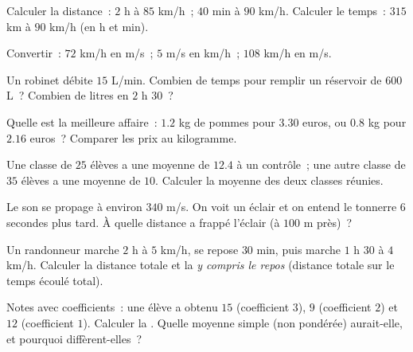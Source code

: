 \begin{exercise}[$\star$]\label{exo:g8:speed:2}
Calculer la distance~: $2$ h à $85$ km/h~; $40$ min à $90$ km/h.
Calculer le temps~: $315$ km à $90$ km/h (en h et min).
\end{exercise}

\begin{exercise}[$\star$]\label{exo:g8:speed:3}
Convertir~: $72$ km/h en m/s~; $5$ m/s en km/h~; $108$ km/h en m/s.
\end{exercise}

\begin{exercise}[$\star$]\label{exo:g8:speed:4}
Un robinet débite $15$ L/min. Combien de temps pour remplir un
réservoir de $600$ L~? Combien de litres en $2$ h $30$~?
\end{exercise}

\begin{exercise}[$\star$]\label{exo:g8:speed:5}
Quelle est la meilleure affaire~: $1.2$ kg de pommes pour $3.30$
euros, ou $0.8$ kg pour $2.16$ euros~? Comparer les prix au kilogramme.
\end{exercise}

\begin{exercise}[$\star$]\label{exo:g8:speed:6}
Une classe de $25$ élèves a une moyenne de $12.4$ à un contrôle~;
une autre classe de $35$ élèves a une moyenne de $10$. Calculer la
moyenne des deux classes réunies.
\end{exercise}

\begin{exercise}[$\star$]\label{exo:g8:speed:7}
Le son se propage à environ $340$ m/s. On voit un éclair et on entend
le tonnerre $6$ secondes plus tard. À quelle distance a frappé
l'éclair (à $100$ m près)~?
\end{exercise}

\begin{exercise}[$\star\star$]\label{exo:g8:speed:8}
Un randonneur marche $2$ h à $5$ km/h, se repose $30$ min, puis marche
$1$ h $30$ à $4$ km/h. Calculer la distance totale et la  \emph{y compris le repos} (distance totale sur le temps
écoulé total).
\end{exercise}

\begin{exercise}[$\star\star$]\label{exo:g8:speed:9}
Notes avec coefficients~: une élève a obtenu $15$ (coefficient $3$),
$9$ (coefficient $2$) et $12$ (coefficient $1$). Calculer la . Quelle moyenne simple (non pondérée) aurait-elle, et
pourquoi diffèrent-elles~?
\end{exercise}

